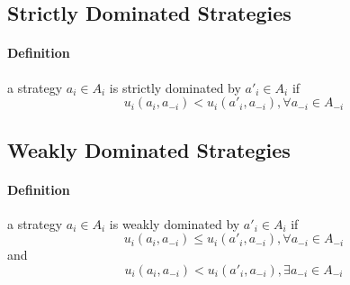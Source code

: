 \documentclass[10pt,a4paper]{report}
\begin{document}
\subsection{Strictly Dominated Strategies}
\paragraph{Definition}a strategy $a_i \in A_i $ is strictly dominated by $a'_i \in A_i$ if
\begin{equation} u_i(a_i, a_{-i}) < u_i(a'_i, a_{-i}) ,  \forall   a_{-i} \in A_{-i} \end{equation}
\subsection{Weakly Dominated Strategies}
\paragraph{Definition}a strategy $a_i \in A_i $ is weakly dominated by $a'_i \in A_i$ if
\begin{equation} u_i(a_i, a_{-i}) \leq u_i(a'_i, a_{-i}) ,  \forall   a_{-i} \in A_{-i} \end{equation}
and \begin{equation} u_i(a_i, a_{-i}) < u_i(a'_i, a_{-i}) ,\exists   a_{-i} \in A_{-i} \end{equation} 
\end{document}

